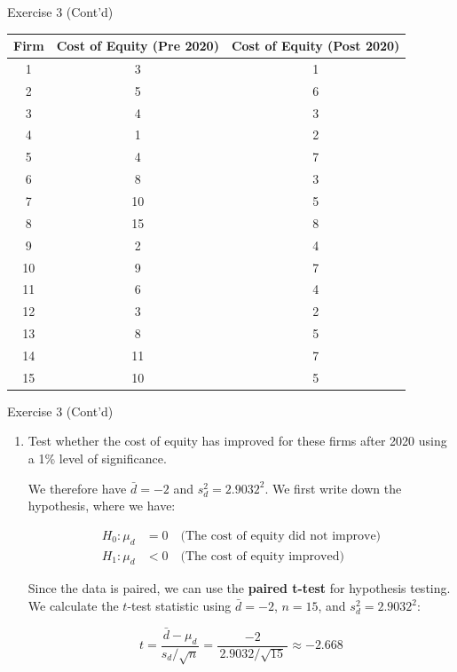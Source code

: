 \documentclass[
  ignorenonframetext,
  aspectratio=43,
]{beamer}
\let\olditem\item
\renewcommand\item{\olditem\justifying}
\begin{document}
\begin{frame}{Exercise 3 (Cont'd)}
\protect\hypertarget{exercise-3-contd}{}
\bigskip

\begin{longtable}[]{@{}ccc@{}}
\toprule()
Firm & Cost of Equity (Pre 2020) & Cost of Equity (Post 2020) \\
\midrule()
\endhead
1 & 3 & 1 \\
2 & 5 & 6 \\
3 & 4 & 3 \\
4 & 1 & 2 \\
5 & 4 & 7 \\
6 & 8 & 3 \\
7 & 10 & 5 \\
8 & 15 & 8 \\
9 & 2 & 4 \\
10 & 9 & 7 \\
11 & 6 & 4 \\
12 & 3 & 2 \\
13 & 8 & 5 \\
14 & 11 & 7 \\
15 & 10 & 5 \\
\bottomrule()
\end{longtable}
\end{frame}

\begin{frame}{Exercise 3 (Cont'd)}
\protect\hypertarget{exercise-3-contd-1}{}
\begin{enumerate}
\item
  Test whether the cost of equity has improved for these firms after
  2020 using a 1\% level of significance.

  \pause

  We therefore have \(\bar{d} = -2\) and \(s_d^2 = 2.9032^2\). We first
  write down the hypothesis, where we have: \vspace{-5pt}

  \pause

  \[
   \begin{aligned}
   H_0: \mu_d &= 0 \quad \text{(The cost of equity did not improve)} \\
   H_1: \mu_d &< 0 \quad \text{(The cost of equity improved)} 
   \end{aligned}
   \]

  \pause

  Since the data is paired, we can use the \textbf{paired t-test} for
  hypothesis testing. We calculate the \(t\)-test statistic using
  \(\bar{d} = -2\), \(n = 15\), and \(s_d^2 = 2.9032^2\):

  \pause

  \[
   t = \frac{\bar{d} - \mu_d}{s_d / \sqrt{n}}
        = \frac{-2}{\,2.9032 / \sqrt{15}\,}
        \approx -2.668
   \]
\end{enumerate}
\end{frame}
\end{document}
